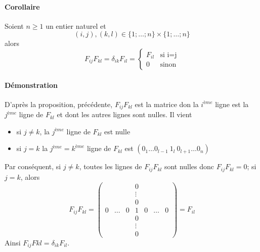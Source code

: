 \paragraph{Corollaire} Soient $n \geq 1$ un entier naturel et
$$(i, j), (k, l) \in \{1; \ldots; n\}\times\{1; \ldots; n\}$$
alors
$$F_{ij}F_{kl} = \delta_{ik} F_{il} = 
  \left\{\begin{array}{lr} F_{il} & \text{si i=j} \\ 0 & \text{sinon} \end{array} \right.$$

\paragraph{Démonstration} D'après la proposition, précédente, $F_{ij} F_{kl}$ est la matrice don la $i^{ème}$ ligne est la $j^{ème}$ ligne de $F_{kl}$ et dont les autres lignes sont nulles. Il vient
\begin{itemize}
  \item si $j\neq k$, la $j^{ème}$ ligne de $F_{kl}$ est nulle
  \item si $j = k$ la $j^{ème} = k^{ème}$ ligne de $F_{kl}$ est $(0_{1} \ldots 0_{l-1} ~ 1_{l} ~ 0_{l+1} \ldots 0_{n})$
\end{itemize}
Par conséquent, si $j\neq k$, toutes les lignes de $F_{ij} F_{kl}$ sont nulles donc $F_{ij} F_{kl} = 0$; si $j=k$, alors 
$$F_{ij} F_{kl} = \begin{pmatrix} 
  & & & 0 & & & \\
  & & & \vdots & & & \\
  & & & 0 & & & \\
  0 & \ldots & 0 & 1 & 0 & \ldots & 0 \\
  & & & 0 & & & \\
  & & & \vdots & & & \\
  & & & 0 & & & 
\end{pmatrix} = F_{il}$$
Ainsi $F_{ij} F{kl} = \delta_{ik} F_{il}$.
